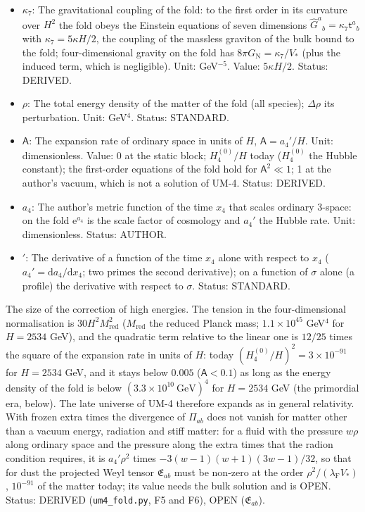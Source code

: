 \documentclass[
  10pt,
]{article}
\begin{document}
\begin{itemize}
  other directions of the fold); \(V_*\rho_7\) in the four-dimensional
  normalisation. Unit: GeV\(^7\). Status: DERIVED.
\item
  \(\kappa_7\): The gravitational coupling of the fold: to the first
  order in its curvature over \(H^2\) the fold obeys the Einstein
  equations of seven dimensions
  \(\hat G^a{}_b = \kappa_7\mathsf{t}^a{}_b\) with
  \(\kappa_7 = 5\kappa H/2\), the coupling of the massless graviton of
  the bulk bound to the fold; four-dimensional gravity on the fold has
  \(8\pi G_{\mathrm{N}} = \kappa_7/V_*\) (plus the induced term, which
  is negligible). Unit: GeV\(^{-5}\). Value: \(5\kappa H/2\). Status:
  DERIVED.
\item
  \(\rho\): The total energy density of the matter of the fold (all
  species); \(\Delta\rho\) its perturbation. Unit: GeV\(^4\). Status:
  STANDARD.
\item
  \(\mathsf{A}\): The expansion rate of ordinary space in units of
  \(H\), \(\mathsf{A} = a_4'/H\). Unit: dimensionless. Value: 0 at the
  static block; \(H_4^{(0)}/H\) today (\(H_4^{(0)}\) the Hubble
  constant); the first-order equations of the fold hold for
  \(\mathsf{A}^2 \ll 1\); 1 at the author's vacuum, which is not a
  solution of UM-4. Status: DERIVED.
\item
  \(a_4\): The author's metric function of the time \(x_4\) that scales
  ordinary 3-space: on the fold \(\mathrm{e}^{a_4}\) is the scale factor
  of cosmology and \(a_4'\) the Hubble rate. Unit: dimensionless.
  Status: AUTHOR.
\item
  \({}'\): The derivative of a function of the time \(x_4\) alone with
  respect to \(x_4\) (\(a_4' = \mathrm{d}a_4/\mathrm{d}x_4\); two primes
  the second derivative); on a function of \(\sigma\) alone (a profile)
  the derivative with respect to \(\sigma\). Status: STANDARD.
\end{itemize}

The size of the correction of high energies. The tension in the
four-dimensional normalisation is \(30H^2M_{\mathrm{red}}^2\)
(\(M_{\mathrm{red}}\) the reduced Planck mass; \(1.1\times10^{45}\)
GeV\(^4\) for \(H = 2534\) GeV), and the quadratic term relative to the
linear one is \(12/25\) times the square of the expansion rate in units
of \(H\): today \((H_4^{(0)}/H)^2 = 3\times10^{-91}\) for \(H = 2534\)
GeV, and it stays below \(0.005\) (\(\mathsf{A} < 0.1\)) as long as the
energy density of the fold is below \((3.3\times10^{10}\ \text{GeV})^4\)
for \(H = 2534\) GeV (the primordial era, below). The late universe of
UM-4 therefore expands as in general relativity. With frozen extra times
the divergence of \(\Pi_{ab}\) does not vanish for matter other than a
vacuum energy, radiation and stiff matter: for a fluid with the pressure
\(w\rho\) along ordinary space and the pressure along the extra times
that the radion condition requires, it is \(a_4'\rho^2\) times
\(-3(w - 1)(w + 1)(3w - 1)/32\), so that for dust the projected Weyl
tensor \(\mathfrak{E}_{ab}\) must be non-zero at the order
\(\rho^2/(\lambda_{\mathrm{F}}V_*)\), \(10^{-91}\) of the matter today;
its value needs the bulk solution and is OPEN. Status: DERIVED
(\texttt{um4\_fold.py}, F5 and F6), OPEN (\(\mathfrak{E}_{ab}\)).
\end{document}
